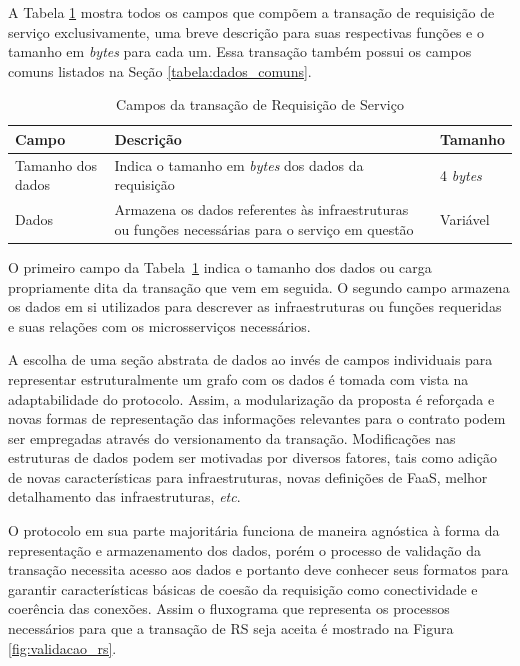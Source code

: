 %
A Tabela \ref{tabela:rs} mostra todos os campos que compõem a transação de requisição de serviço exclusivamente, uma breve descrição para suas respectivas funções e o tamanho em \textit{bytes} para cada um. Essa transação também possui os campos comuns listados na Seção \ref{tabela:dados_comuns}.
\begin{table}[ht]
\centering
    \begin{tabular}{|m{}|m{}|m{}|}
    \hline
         \textbf{Campo} & \textbf{Descrição} & \textbf{Tamanho}  \\
         \hline
         Tamanho dos dados & Indica o tamanho em \textit{bytes} dos dados da requisição & 4 \textit{bytes} \\
         \hline
         Dados & Armazena os dados referentes às infraestruturas ou funções necessárias para o serviço em questão & Variável \\
    \hline
    \end{tabular}
    \caption{Campos da transação de Requisição de Serviço}
    \label{tabela:rs}
\end{table}

O primeiro campo da Tabela~\ref{tabela:rs} indica o tamanho dos dados ou carga propriamente dita da transação que vem em seguida. O segundo campo armazena os dados em si utilizados para descrever as infraestruturas ou funções requeridas e suas relações com os microsserviços necessários. 

A escolha de uma seção abstrata de dados ao invés de campos individuais para representar estruturalmente um grafo com os dados é tomada com vista na adaptabilidade do protocolo. Assim, a modularização da proposta é reforçada e novas formas de representação das informações relevantes para o contrato podem ser empregadas através do versionamento da transação. Modificações nas estruturas de dados podem ser motivadas por diversos fatores, tais como adição de novas características para infraestruturas, novas definições de \ac{FaaS}, melhor detalhamento das infraestruturas, \textit{etc}.

O protocolo em sua parte majoritária funciona de maneira agnóstica à forma da representação e armazenamento dos dados, porém o processo de validação da transação necessita acesso aos dados e portanto deve conhecer seus formatos para garantir características básicas de coesão da requisição como conectividade e coerência das conexões. Assim o fluxograma que representa os processos necessários para que a transação de \ac{RS} seja aceita é mostrado na Figura \ref{fig:validacao_rs}.

